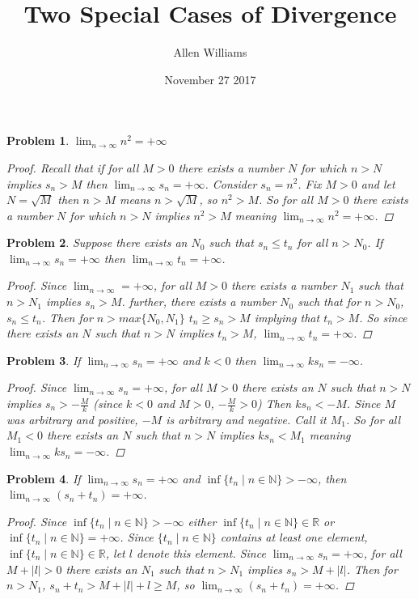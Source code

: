 \documentclass{article}
\title{Two Special Cases of Divergence}
\author{Allen Williams }
\date{November 27 2017}
\newtheorem*{Problem}{Problem}
\begin{document}
\maketitle

\begin{Problem}
   $\lim_{n\to\infty}n^2=+\infty$
   \begin{proof}
   Recall that if for all $M>0$ there exists a number $N$ for which $n>N$ implies $s_n>M$ then $\lim_{n\to\infty}s_n=+\infty$.  Consider $s_n=n^2$.  Fix $M>0$ and let $N=\sqrt{M}$ then $n>M$ means $n>\sqrt{M}$, so $n^2>M$.  So for all $M>0$ there exists a number $N$ for which $n>N$ implies $n^2>M$ meaning $\lim_{n\to\infty}n^2=+\infty$.
   \end{proof}
\end{Problem}

\begin{Problem}
   Suppose there exists an $N_0$ such that $s_n\leq t_n$ for all $n>N_0$.  If $\lim_{n\to\infty}s_n=+\infty$ then $\lim_{n\to\infty}t_n=+\infty$.
   \begin{proof}
   Since $\lim_{n\to\infty}=+\infty$, for all $M>0$ there exists a number $N_1$ such that $n>N_1$ implies $s_n>M$.  further, there exists a number $N_0$ such that for $n>N_0$, $s_n \leq t_n$.  Then for $n>max\{N_0, N_1\}$ $t_n\geq s_n>M$ implying that $t_n>M$.  So since there exists an $N$ such that $n>N$ implies $t_n>M$, $\lim_{n\to\infty}t_n=+\infty$.
   \end{proof}
\end{Problem}

\begin{Problem}
   If $\lim_{n\to\infty}s_n=+\infty$ and $k<0$ then $\lim_{n\to\infty}ks_n=-\infty$.
   \begin{proof}
   Since $\lim_{n\to\infty}s_n=+\infty$, for all $M>0$ there exists an $N$ such that $n>N$ implies $s_n>-\frac{M}{k}$ (since $k<0$ and $M>0$, $-\frac{M}{k}>0$)  Then $ks_n<-M$.  Since $M$ was arbitrary and positive, $-M$ is arbitrary and negative.  Call it $M_1$.  So for all $M_1<0$ there exists an $N$ such that $n>N$ implies $ks_n<M_1$ meaning $\lim_{n\to\infty}ks_n=-\infty$.
   \end{proof}
\end{Problem}

\begin{Problem}
   If $\lim_{n\to\infty}s_n=+\infty$ and $\inf\{t_n\mid n\in\mathbb{N}\}>-\infty$, then \\ $\lim_{n\to\infty}(s_n+t_n)=+\infty$.
   \begin{proof}
   Since $\inf\{t_n\mid n\in\mathbb{N}\}>-\infty$ either $\inf\{t_n\mid n\in\mathbb{N}\}\in\mathbb{R}$ or \\ $\inf\{t_n\mid n\in\mathbb{N}\}=+\infty$.  Since $\{t_n\mid n\in\mathbb{N}\}$ contains at least one element, $\inf\{t_n\mid n\in\mathbb{N}\}\in\mathbb{R}$, let $l$ denote this element.  Since $\lim_{n\to\infty}s_n=+\infty$, for all $M+\lvert l\rvert>0$ there exists an $N_1$ such that $n>N_1$ implies $s_n>M+\lvert l\rvert$.  Then for $n>N_1$, $s_n+t_n>M+\lvert l\rvert+l\geq M$, so $\lim_{n\to\infty}(s_n+t_n)=+\infty$.
   \end{proof}
\end{Problem}
\end{document}

